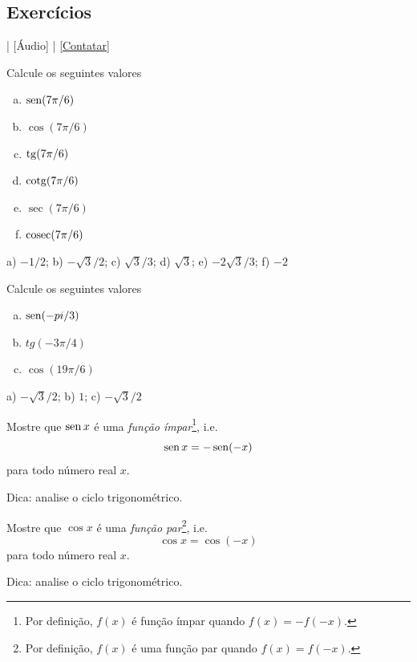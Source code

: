 \subsection*{Exercícios}

\begin{flushright}
  [Vídeo] | [Áudio] | \href{https://phkonzen.github.io/notas/contato.html}{[Contatar]}
\end{flushright}

\begin{exer}
  Calcule os seguintes valores
  \begin{enumerate}[a)]
  \item $\operatorname{sen}(7\pi/6)$
  \item $\cos(7\pi/6)$
  \item $\operatorname{tg}(7\pi/6)$
  \item $\operatorname{cotg}(7\pi/6)$
  \item $\sec(7\pi/6)$
  \item $\operatorname{cosec}(7\pi/6)$
  \end{enumerate}
\end{exer}
\begin{resp}
  a) $-1/2$; b) $-\sqrt{3}/2$; c) $\sqrt{3}/3$; d) $\sqrt{3}$; e) $-2\sqrt{3}/3$; f) $-2$
\end{resp}

\begin{exer}
  Calcule os seguintes valores
  \begin{enumerate}[a)]
  \item $\operatorname{sen}(-pi/3)$
  \item $tg(-3\pi/4)$
  \item $\cos(19\pi/6)$
  \end{enumerate}
\end{exer}
\begin{resp}
  a) $-\sqrt{3}/2$; b) $1$; c) $-\sqrt{3}/2$
\end{resp}

\begin{exer}
  Mostre que $\operatorname{sen} x$ é  uma \emph{função ímpar}\footnote{Por definição, $f(x)$ é função ímpar quando $f(x)=-f(-x)$.}, i.e.
  \begin{equation}
    \operatorname{sen} x = -\operatorname{sen}(-x)
  \end{equation}
  para todo número real $x$.
\end{exer}
\begin{resp}
  Dica: analise o ciclo trigonométrico.
\end{resp}

\begin{exer}
  Mostre que $\cos x$ é  uma \emph{função par}\footnote{Por definição, $f(x)$ é uma função par quando $f(x)=f(-x)$.}, i.e.
  \begin{equation}
    \cos x = \cos(-x)
  \end{equation}
  para todo número real $x$.
\end{exer}
\begin{resp}
  Dica: analise o ciclo trigonométrico.
\end{resp}

